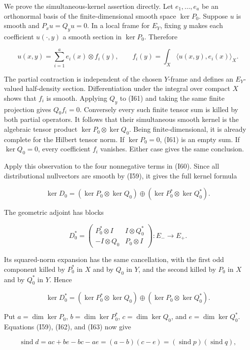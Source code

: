 \documentclass[
  11pt,
]{article}
\begin{document}
We prove the simultaneous-kernel assertion directly. Let
\(e_1,\ldots,e_a\) be an orthonormal basis of the finite-dimensional
smooth space \(\ker P_0\). Suppose \(u\) is smooth and \(P_xu=Q_yu=0\).
In a local frame for \(E_Y\), fixing \(y\) makes each coefficient
\(u(\cdot,y)\) a smooth section in \(\ker P_0\). Therefore

\[
 u(x,y)=\sum_{i=1}^a e_i(x)\otimes f_i(y),
 \qquad
 f_i(y)=\int_X\langle u(x,y),e_i(x)\rangle_X.
 \tag{I61}
\]

The partial contraction is independent of the chosen \(Y\)-frame and
defines an \(E_Y\)-valued half-density section. Differentiation under
the integral over compact \(X\) shows that \(f_i\) is smooth. Applying
\(Q_y\) to (I61) and taking the same finite projection gives
\(Q_0f_i=0\). Conversely every such finite tensor sum is killed by both
partial operators. It follows that their simultaneous smooth kernel is
the algebraic tensor product \(\ker P_0\otimes\ker Q_0\). Being
finite-dimensional, it is already complete for the Hilbert tensor norm.
If \(\ker P_0=0\), (I61) is an empty sum. If \(\ker Q_0=0\), every
coefficient \(f_i\) vanishes. Either case gives the same conclusion.

Apply this observation to the four nonnegative terms in (I60). Since all
distributional nullvectors are smooth by (I59), it gives the full kernel
formula

\[
 \ker D_0=(\ker P_0\otimes\ker Q_0)
               \oplus(\ker P_0^*\otimes\ker Q_0^*).
 \tag{I62}
\]

The geometric adjoint has blocks

\[
 D_0^*=\begin{pmatrix}
 P_0^*\otimes I&I\otimes Q_0^*\\
 -I\otimes Q_0&P_0\otimes I
 \end{pmatrix}:E_-\longrightarrow E_+.
\]

Its squared-norm expansion has the same cancellation, with the first odd
component killed by \(P_0^*\) in \(X\) and by \(Q_0\) in \(Y\), and the
second killed by \(P_0\) in \(X\) and by \(Q_0^*\) in \(Y\). Hence

\[
 \ker D_0^*=(\ker P_0^*\otimes\ker Q_0)
               \oplus(\ker P_0\otimes\ker Q_0^*).
 \tag{I63}
\]

Put \(a=\dim\ker P_0\), \(b=\dim\ker P_0^*\), \(c=\dim\ker Q_0\), and
\(e=\dim\ker Q_0^*\). Equations (I59), (I62), and (I63) now give

\[
 \operatorname{sind}d
   =ac+be-bc-ae
   =(a-b)(c-e)
   =(\operatorname{sind}p)(\operatorname{sind}q),
 \tag{I64}
\]
\end{document}
